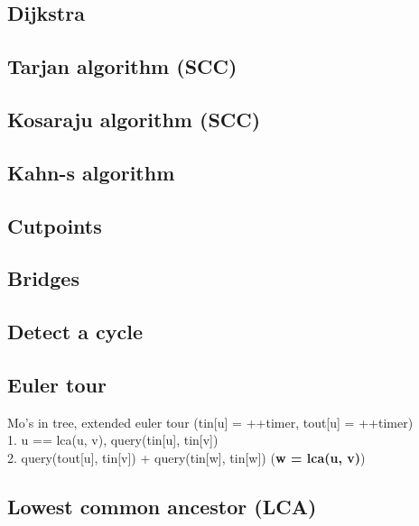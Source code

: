 \subsection{Dijkstra}
\newpage

\subsection{Tarjan algorithm (SCC)}
\subsection{Kosaraju algorithm (SCC)}
\subsection{Kahn-s algorithm}
\subsection{Cutpoints}
\subsection{Bridges}

\subsection{Detect a cycle}
\newpage

\subsection{Euler tour}
\begin{flushleft}
Mo's in tree, extended euler tour (tin[u] = ++timer, tout[u] = ++timer) \\
  1. u == lca(u, v), query(tin[u], tin[v]) \\
  2. query(tout[u], tin[v]) + query(tin[w], tin[w]) (\textbf{w = lca(u, v)})
\end{flushleft}
\subsection{Lowest common ancestor (LCA)}

